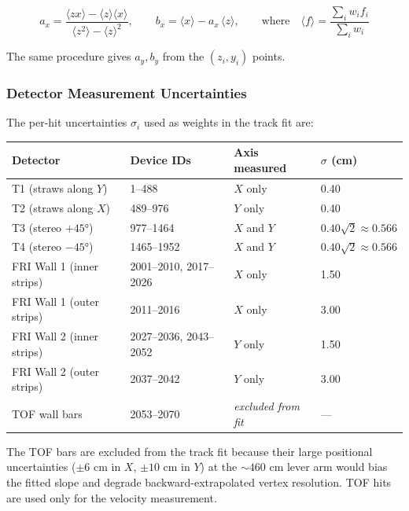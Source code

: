 \begin{equation}
    a_x = \frac{\langle zx \rangle - \langle z \rangle\langle x \rangle}{\langle z^2 \rangle - \langle z \rangle^2},
    \qquad
    b_x = \langle x \rangle - a_x\,\langle z \rangle,
    \qquad \text{where} \quad
    \langle f \rangle = \frac{\sum_i w_i f_i}{\sum_i w_i}
\end{equation}

The same procedure gives $a_y, b_y$ from the $(z_i, y_i)$ points.

\subsubsection{Detector Measurement Uncertainties}

The per-hit uncertainties $\sigma_i$ used as weights in the track fit are:

\begin{center}
\begin{tabular}{llll}
    \toprule
    \textbf{Detector} & \textbf{Device IDs} & \textbf{Axis measured} & \textbf{$\sigma$ (cm)} \\
    \midrule
    T1 (straws along $Y$)        & 1--488      & $X$ only            & 0.40 \\
    T2 (straws along $X$)        & 489--976    & $Y$ only            & 0.40 \\
    T3 (stereo $+45°$)           & 977--1464   & $X$ and $Y$         & $0.40\sqrt{2} \approx 0.566$ \\
    T4 (stereo $-45°$)           & 1465--1952  & $X$ and $Y$         & $0.40\sqrt{2} \approx 0.566$ \\
    FRI Wall 1 (inner strips)    & 2001--2010, 2017--2026 & $X$ only & 1.50 \\
    FRI Wall 1 (outer strips)    & 2011--2016  & $X$ only            & 3.00 \\
    FRI Wall 2 (inner strips)    & 2027--2036, 2043--2052 & $Y$ only & 1.50 \\
    FRI Wall 2 (outer strips)    & 2037--2042  & $Y$ only            & 3.00 \\
    TOF wall bars                & 2053--2070  & \textit{excluded from fit} & --- \\
    \bottomrule
\end{tabular}
\end{center}

\noindent
The TOF bars are excluded from the track fit because their large positional
uncertainties ($\pm 6$ cm in $X$, $\pm 10$ cm in $Y$) at the $\sim\!460$ cm
lever arm would bias the fitted slope and degrade backward-extrapolated vertex
resolution. TOF hits are used only for the velocity measurement.

